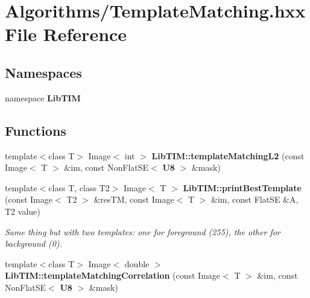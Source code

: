 \section{Algorithms/Template\-Matching.hxx File Reference}
\label{TemplateMatching_8hxx}
\subsection*{Namespaces}
\begin{CompactItemize}
\item 
namespace {\bf Lib\-TIM}
\end{CompactItemize}
\subsection*{Functions}
\begin{CompactItemize}
\item 
template$<$class T$>$ Image$<$ int $>$ {\bf Lib\-TIM::template\-Matching\-L2} (const Image$<$ T $>$ \&im, const Non\-Flat\-SE$<$ {\bf U8} $>$ \&mask)
\item 
template$<$class T, class T2$>$ Image$<$ T $>$ {\bf Lib\-TIM::print\-Best\-Template} (const Image$<$ T2 $>$ \&res\-TM, const Image$<$ T $>$ \&im, const Flat\-SE \&A, T2 value)
\begin{CompactList}\small\item\em Same thing but with two templates: one for foreground (255), the other for background (0). \item\end{CompactList}\item 
template$<$class T$>$ Image$<$ double $>$ {\bf Lib\-TIM::template\-Matching\-Correlation} (const Image$<$ T $>$ \&im, const Non\-Flat\-SE$<$ {\bf U8} $>$ \&mask)
\end{CompactItemize}
